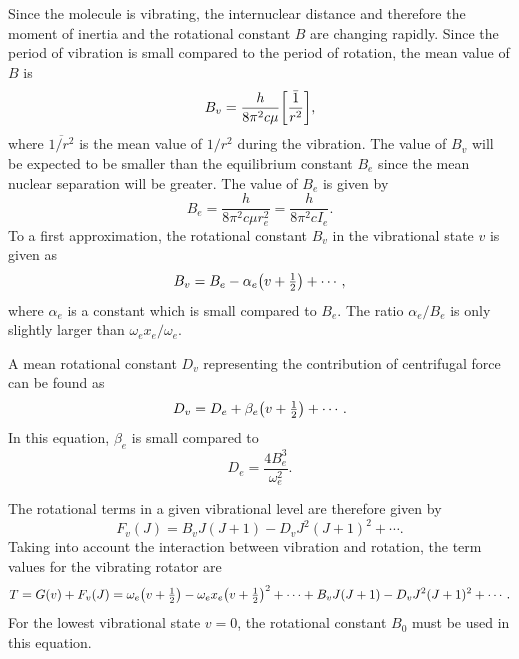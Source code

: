 \documentclass[11pt, twoside, fleqn]{report}
\DeclarePairedDelimiter\p{\lparen}{\rparen}
\DeclarePairedDelimiter\bk{\lbrack}{\rbrack}
\begin{document}
Since the molecule is vibrating, the internuclear distance and therefore the moment of inertia and the rotational constant $B$ are changing rapidly. Since the period of vibration is small compared to the period of rotation, the mean value of $B$ is
\begin{equation*}
    B_v = \frac{h}{8\pi^2c\mu}\bk*{\bar{\frac{1}{r^2}}},
\end{equation*}
where $\overline{1/r^2}$ is the mean value of $1/r^2$ during the vibration. The value of $B_v$ will be expected to be smaller than the equilibrium constant $B_e$ since the mean nuclear separation will be greater. The value of $B_e$ is given by
\begin{equation*}
    B_e = \frac{h}{8\pi^2c\mu{}r_e^2} = \frac{h}{8\pi^2cI_e}.
\end{equation*}
To a first approximation, the rotational constant $B_v$ in the vibrational state $v$ is given as
\begin{equation*}
    B_v = B_e - \alpha_e\p*{v + \tfrac{1}{2}} + \dotsb,
\end{equation*}
where $\alpha_e$ is a constant which is small compared to $B_e$. The ratio $\alpha_e/B_e$ is only slightly larger than $\omega_ex_e/\omega_e$.

A mean rotational constant $D_v$ representing the contribution of centrifugal force can be found as
\begin{equation*}
    D_v = D_e + \beta_e\p*{v + \tfrac{1}{2}} + \dotsb.
\end{equation*}
In this equation, $\beta_e$ is small compared to
\begin{equation*}
    D_e = \frac{4B_e^3}{\omega_e^2}.
\end{equation*}

The rotational terms in a given vibrational level are therefore given by
\begin{equation*}
    F_v(J) = B_vJ(J + 1) - D_vJ^2(J + 1)^2 + \dotsb.
\end{equation*}
Taking into account the interaction between vibration and rotation, the term values for the vibrating rotator are
\begin{equation*}
    T = G(v) + F_v(J) = \omega_e\p*{v + \tfrac{1}{2}} - \omega_ex_e\p*{v + \tfrac{1}{2}}^2 + \dotsb + B_vJ(J + 1) - D_vJ^2(J + 1)^2 + \dotsb.
\end{equation*}
For the lowest vibrational state $v = 0$, the rotational constant $B_0$ must be used in this equation.
\end{document}
